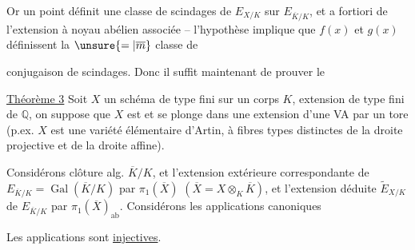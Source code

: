 Or un point définit une classe de   scindages de $E_{X/K}$ sur $E_{\overline K/K}$, et a fortiori de l'extension à noyau abélien associée -- l'hypothèse implique que $f(x)$ et $g(x)$ définissent la $\unsure{=|\overline m}$ classe de

conjugaison de scindages. Donc il suffit maintenant de prouver le

\uline{Théorème 3} Soit $X$ un schéma de type fini sur un corps $K$, extension de type fini de $\mathbb Q$, on suppose que $X$ est   et se plonge dans une extension d'une VA par un tore (p.ex. $X$ est une variété élémentaire d'Artin, à fibres types  distinctes de la droite projective et de la droite affine).


Considérons   clôture alg. $\overline K/K$, et  l'extension extérieure correspondante  de $E_{\overline K/K}=\operatorname{Gal}(\overline K/K)$ par $\pi_1(\overline X)$ $(\overline X=X\otimes_K\overline K)$, et l'extension déduite $\widetilde E_{X/K}$ de $E_{\overline K/K}$ par $\pi_1(\overline X)_{\mathrm{ab}}$. Considérons les applications canoniques

Les applications sont \uline{injectives}.


